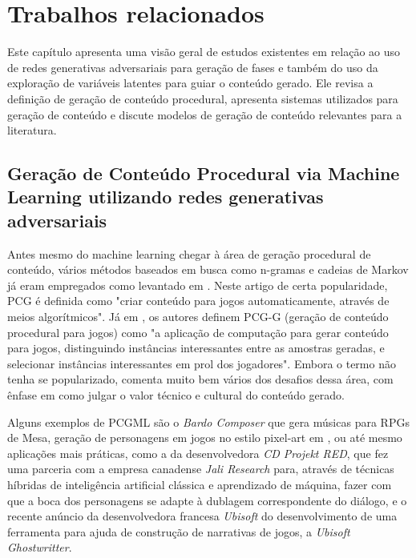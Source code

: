 \chapter{Trabalhos relacionados}


Este capítulo apresenta uma visão geral de estudos existentes em relação ao uso de redes generativas adversariais para geração de fases e também do uso da exploração de variáveis latentes para guiar o conteúdo gerado. Ele revisa a definição de geração de conteúdo procedural, apresenta sistemas utilizados para geração de conteúdo e discute modelos de geração de conteúdo relevantes para a literatura.

\section{Geração de Conteúdo Procedural via Machine Learning utilizando redes generativas adversariais}

Antes mesmo do machine learning chegar à área de geração procedural de conteúdo, vários métodos baseados em busca como n-gramas e cadeias de Markov já eram empregados como levantado em \cite{pcg}. Neste artigo de certa popularidade, PCG é definida como "criar conteúdo para jogos automaticamente, através de meios algorítmicos". Já em \cite{pcg2013}, os autores definem PCG-G (geração de conteúdo procedural para jogos) como "a aplicação de computação para gerar conteúdo para jogos, distinguindo instâncias interessantes entre as amostras geradas, e selecionar instâncias interessantes em prol dos jogadores". Embora o termo não tenha se popularizado, \cite{pcg2013} comenta muito bem vários dos desafios dessa área, com ênfase em como julgar o valor técnico e cultural do conteúdo gerado. 

Alguns exemplos de PCGML são o \emph{Bardo Composer}\cite{bardo} que gera músicas para RPGs de Mesa, geração de personagens em jogos no estilo pixel-art em \cite{sprites}, ou até mesmo aplicações mais práticas, como a da desenvolvedora \emph{CD Projekt RED}, que fez uma parceria com a empresa canadense \emph{Jali Research} para, através de técnicas híbridas de inteligência artificial clássica e aprendizado de máquina, fazer com que a boca dos personagens se adapte à dublagem correspondente do diálogo, e o recente anúncio da desenvolvedora francesa \emph{Ubisoft} do desenvolvimento de uma ferramenta para ajuda de construção de narrativas de jogos, a \emph{Ubisoft Ghostwritter}.

